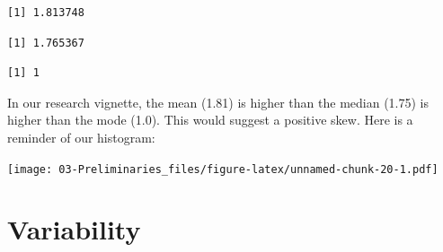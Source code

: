 \documentclass[
  11pt,
]{book}
\newenvironment{Shaded}{\begin{snugshade}}{\end{snugshade}}
\newcommand{\AttributeTok}[1]{\textcolor[rgb]{0.27,0.27,0.27}{#1}}
\newcommand{\ConstantTok}[1]{\textcolor[rgb]{0.37,0.37,0.37}{#1}}
\newcommand{\FunctionTok}[1]{\textcolor[rgb]{0.27,0.27,0.27}{\textbf{#1}}}
\newcommand{\NormalTok}[1]{#1}
\newcommand{\SpecialCharTok}[1]{\textcolor[rgb]{0.43,0.43,0.43}{\textbf{#1}}}
\newcommand{\StringTok}[1]{\textcolor[rgb]{0.5,0.5,0.5}{#1}}
\begin{document}
\begin{verbatim}
[1] 1.813748
\end{verbatim}

\begin{Shaded}
\end{Shaded}

\begin{verbatim}
[1] 1.765367
\end{verbatim}

\begin{Shaded}
\end{Shaded}

\begin{verbatim}
[1] 1
\end{verbatim}

In our research vignette, the mean (1.81) is higher than the median (1.75) is higher than the mode (1.0). This would suggest a positive skew. Here is a reminder of our histogram:

\begin{Shaded}
\end{Shaded}

\texttt{[image: 03-Preliminaries\_files/figure-latex/unnamed-chunk-20-1.pdf]}

\hypertarget{variability}{%
\section{Variability}\label{variability}}
\end{document}
